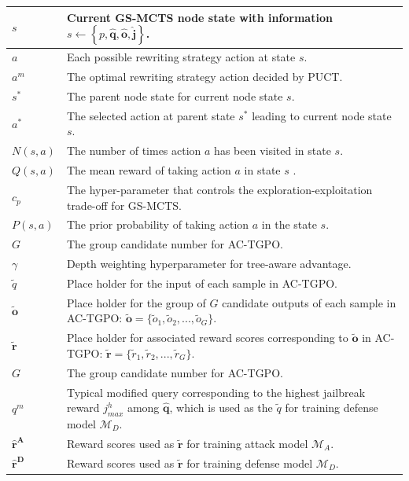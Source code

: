 \documentclass[11pt]{article}
\def\attackmethod{GS-MCTS}
\def\trainingmethod{AC-TGPO}
\begin{document}
\begin{table} [ht]
\begin{tabular}{|p{}|p{}|}
\hline
$s$ & Current {\attackmethod} node state with information $s \gets \left\{p, \mathbf{\hat{q}}, \mathbf{\hat{o}}, \mathbf{\hat{j}}\right\}$. \\
\hline
$a$ & Each possible rewriting strategy action at state $s$. \\
\hline
$a^{m}$ & The optimal rewriting strategy action decided by PUCT. \\
\hline
$s^{*}$ & The parent node state for current node state $s$. \\
\hline
$a^{*}$ & The selected action at parent state $s^{*}$ leading to current node state $s$. \\
\hline
$N(s,a)$ & The number of times action $a$ has been visited in state $s$. \\
\hline
$Q(s,a)$ & The mean reward of taking action $a$ in state $s$ . \\
\hline
$c_{p}$ & The hyper-parameter that controls the exploration-exploitation trade-off for {\attackmethod}. \\
\hline
$P(s,a)$ & The prior probability of taking action $a$ in the state $s$. \\
\hline
$G$ & The group candidate number for {\trainingmethod}. \\
\hline
$\gamma$ & Depth weighting hyperparameter for tree-aware advantage. \\
\hline
$\widetilde{q}$ & Place holder for the input of each sample in {\trainingmethod}. \\
\hline
$\mathbf{\widetilde{o}}$ & Place holder for the group of $G$ candidate outputs of each sample in {\trainingmethod}: $\mathbf{\widetilde{o}} = \{\widetilde{o}_1, \widetilde{o}_2, ..., \widetilde{o}_G\}$. \\
\hline
$\mathbf{\widetilde{r}}$ & Place holder for associated reward scores corresponding to $\mathbf{\widetilde{o}}$ in {\trainingmethod}: $\mathbf{\widetilde{r}} = \{\widetilde{r}_1, \widetilde{r}_2, ..., \widetilde{r}_G\}$. \\
\hline
$G$ & The group candidate number for {\trainingmethod}. \\
\hline
$q^{m}$ & Typical modified query corresponding to the highest jailbreak reward $j_{max}^{h}$ among $\mathbf{\hat{q}}$, which is used as the $\widetilde{q}$ for training defense model $\mathcal{M}_{D}$. \\
\hline
$\mathbf{\hat{r}^{A}}$ & Reward scores used as $\mathbf{\widetilde{r}}$ for training attack model $\mathcal{M}_{A}$. \\
\hline
$\mathbf{\hat{r}^{D}}$ & Reward scores used as $\mathbf{\widetilde{r}}$ for training defense model $\mathcal{M}_{D}$. \\

\end{tabular}
\end{table}
\end{document}
